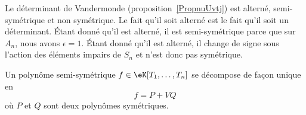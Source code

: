 \begin{example}
	Le déterminant de Vandermonde (proposition~\ref{PropnuUvtj}) est alterné, semi-symétrique et non symétrique. Le fait qu'il soit alterné est le fait qu'il soit un déterminant. Étant donné qu'il est alterné, il est semi-symétrique parce que sur \( A_n\), nous avons \( \epsilon=1\). Étant donné qu'il est alterné, il change de signe sous l'action des éléments impairs de \( S_n\) et n'est donc pas symétrique.
\end{example}

\begin{proposition} \label{PropUDqXax}
	Un polynôme semi-symétrique \( f\in \eK[T_1,\ldots, T_n]\) se décompose de façon unique en
	\begin{equation}
		f=P+VQ
	\end{equation}
	où \( P\) et \( Q\) sont deux polynômes symétriques.
\end{proposition}

